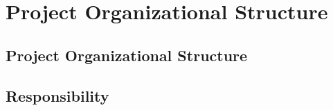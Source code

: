 \chapter{Project Organizational Structure}

\section{Project Organizational Structure}

\section{Responsibility}